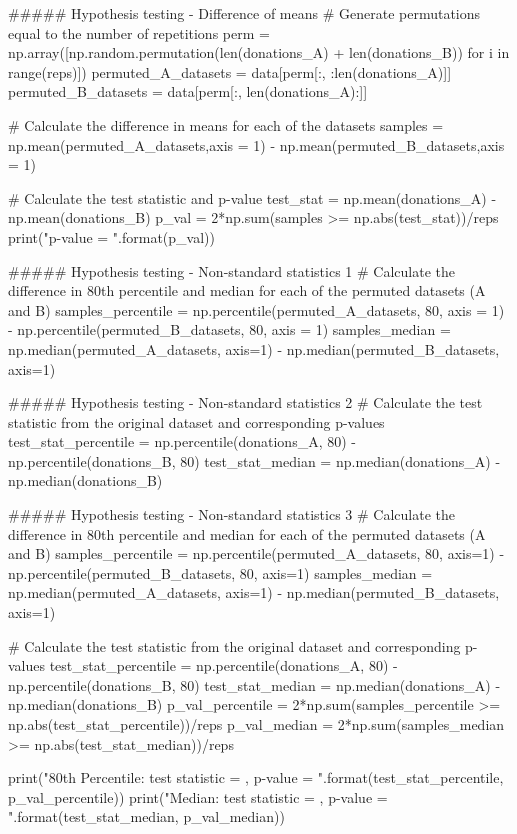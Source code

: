 ##### Hypothesis testing - Difference of means
# Generate permutations equal to the number of repetitions
perm = np.array([np.random.permutation(len(donations_A) + len(donations_B)) for i in range(reps)])
permuted_A_datasets = data[perm[:, :len(donations_A)]]
permuted_B_datasets = data[perm[:, len(donations_A):]]

# Calculate the difference in means for each of the datasets
samples = np.mean(permuted_A_datasets,axis = 1) - np.mean(permuted_B_datasets,axis = 1)

# Calculate the test statistic and p-value
test_stat = np.mean(donations_A) - np.mean(donations_B)
p_val = 2*np.sum(samples >= np.abs(test_stat))/reps
print("p-value = {}".format(p_val))

##### Hypothesis testing - Non-standard statistics 1
# Calculate the difference in 80th percentile and median for each of the permuted datasets (A and B)
samples_percentile = np.percentile(permuted_A_datasets, 80, axis = 1) - np.percentile(permuted_B_datasets, 80, axis = 1)
samples_median = np.median(permuted_A_datasets, axis=1)   - np.median(permuted_B_datasets, axis=1)


##### Hypothesis testing - Non-standard statistics 2
# Calculate the test statistic from the original dataset and corresponding p-values
test_stat_percentile = np.percentile(donations_A, 80) - np.percentile(donations_B, 80)
test_stat_median = np.median(donations_A) - np.median(donations_B)

##### Hypothesis testing - Non-standard statistics 3
# Calculate the difference in 80th percentile and median for each of the permuted datasets (A and B)
samples_percentile = np.percentile(permuted_A_datasets, 80, axis=1) - np.percentile(permuted_B_datasets, 80, axis=1)
samples_median = np.median(permuted_A_datasets, axis=1) - np.median(permuted_B_datasets, axis=1)

# Calculate the test statistic from the original dataset and corresponding p-values
test_stat_percentile = np.percentile(donations_A, 80) - np.percentile(donations_B, 80)
test_stat_median = np.median(donations_A) - np.median(donations_B)
p_val_percentile = 2*np.sum(samples_percentile >= np.abs(test_stat_percentile))/reps
p_val_median = 2*np.sum(samples_median >= np.abs(test_stat_median))/reps

print("80th Percentile: test statistic = {}, p-value = {}".format(test_stat_percentile, p_val_percentile))
print("Median: test statistic = {}, p-value = {}".format(test_stat_median, p_val_median))
